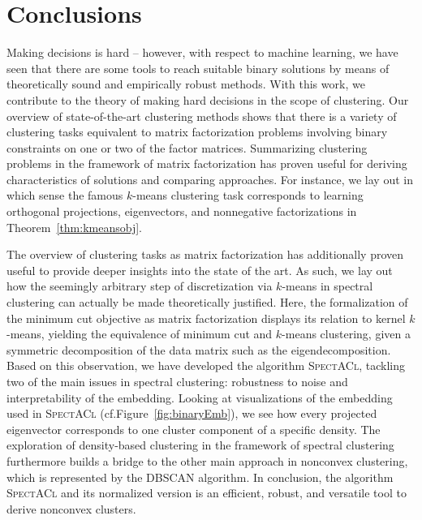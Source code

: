 \chapter{Conclusions}\label{chap:Conclusions}
Making decisions is hard -- however, with respect to machine learning, we have seen that there are some tools to reach suitable binary solutions by means of theoretically sound and empirically robust methods. With this work, we contribute to the theory of making hard decisions in the scope of clustering. Our overview of state-of-the-art clustering methods shows that there is a variety of clustering tasks equivalent to matrix factorization problems involving binary constraints on one or two of the factor matrices. Summarizing clustering problems in the framework of matrix factorization has proven useful for deriving characteristics of solutions and comparing approaches. For instance, we lay out in which sense the famous $k$-means clustering task corresponds to learning orthogonal projections, eigenvectors, and nonnegative factorizations in Theorem~\ref{thm:kmeansobj}.  

The overview of clustering tasks as matrix factorization has additionally proven useful to provide deeper insights into the state of the art. As such, we lay out how the seemingly arbitrary step of discretization via $k$-means in spectral clustering can actually be made theoretically justified. Here, the formalization of the minimum cut objective as matrix factorization displays its relation to kernel $k$-means, yielding the equivalence of minimum cut and $k$-means clustering, given a symmetric decomposition of the data matrix such as the eigendecomposition. Based on this observation, we have developed the algorithm \textsc{SpectACl}, tackling two of the main issues in spectral clustering: robustness to noise and interpretability of the embedding. Looking at visualizations of the  embedding used in \textsc{SpectACl} (cf.\@ Figure~\ref{fig:binaryEmb}), we see how every projected eigenvector corresponds to one cluster component of a specific density. The exploration of density-based clustering in the framework of spectral clustering furthermore builds a bridge to the other main approach in nonconvex clustering, which is represented by the DBSCAN algorithm. In conclusion, the algorithm \textsc{SpectACl} and its normalized version is an efficient, robust, and versatile tool to derive nonconvex clusters.

